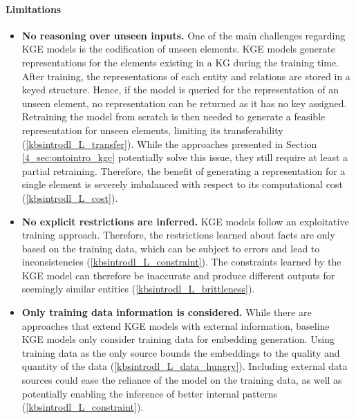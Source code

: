 \paragraph{Limitations}
\begin{itemize}
    \item \textbf{No reasoning over unseen inputs.} One of the main challenges regarding KGE models is the codification of unseen elements. KGE models generate representations for the elements existing in a KG during the training time. After training, the representations of each entity and relations are stored in a keyed structure. Hence, if the model is queried for the representation of an unseen element, no representation can be returned as it has no key assigned. Retraining the model from scratch is then needed to generate a feasible representation for unseen elements, limiting its transferability (\ref{kbsintrodl_L_transfer}). While the approaches presented in Section \ref{4_sec:ontointro_kgc} potentially solve this issue, they still require at least a partial retraining. Therefore, the benefit of generating a representation for a single element is severely imbalanced with respect to its computational cost (\ref{kbsintrodl_L_cost}). 
    
    \item \textbf{No explicit restrictions are inferred.} KGE models follow an exploitative training approach. Therefore, the restrictions learned about facts are only based on the training data, which can be subject to errors and lead to inconsistencies (\ref{kbsintrodl_L_constraint}). The constraints learned by the KGE model can therefore be inaccurate and produce different outputs for seemingly similar entities (\ref{kbsintrodl_L_brittleness}).  
    
    \item \textbf{Only training data information is considered.} While there are approaches that extend KGE models with external information, baseline KGE models only consider training data for embedding generation. Using training data as the only source bounds the embeddings to the quality and quantity of the data (\ref{kbsintrodl_L_data_hungry}). Including external data sources could ease the reliance of the model on the training data, as well as potentially enabling the inference of better internal patterns (\ref{kbsintrodl_L_constraint}). 
\end{itemize}
